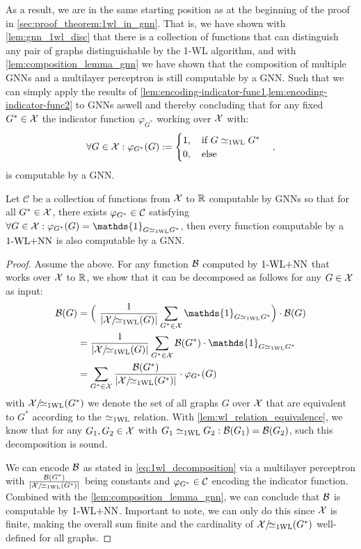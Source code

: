 As a result, we are in the same starting position as at the beginning of the proof in \autoref{sec:proof_theorem:1wl_in_gnn}. That is, we have shown with \cref{lem:gnn_1wl_disc} that there is a collection of functions that can distinguish any pair of graphs distinguishable by the 1-WL algorithm, and with \cref{lem:composition_lemma_gnn} we have shown that the composition of multiple GNNs and a multilayer perceptron is still computable by a GNN. Such that we can simply apply the results of \cref{lem:encoding-indicator-func1,lem:encoding-indicator-func2} to GNNs aswell and thereby concluding that for any fixed $G^* \in \mathcal{X}$ the indicator function $\varphi_{G^*}$ working over $\mathcal{X}$ with:
\begin{align*}
    \forall G \in \mathcal{X}: \varphi_{G^*}(G) := \begin{cases}
    1, \quad \text{if $G \simeq_{\text{1WL}} G^*$}\\
    0, \quad \text{else}
\end{cases},
\end{align*}
is computable by a GNN.

\begin{lemma}\label{lem:decompose_gnn_as_wl}
    Let $\mathcal{C}$ be a collection of functions from $\mathcal{X}$ to $\mathbb{R}$ computable by GNNs so that for all $G^* \in \mathcal{X}$, there exists 
    $\varphi_{G^*} \in \mathcal{C}$ satisfying $\forall G \in \cX: \varphi_{G^*}(G) = \mathds{1}_{G \wliso G^*}$, then every function computable by a $\text{1-WL+NN}$ is also computable by a GNN.
\end{lemma}

\begin{proof}
    Assume the above. For any function $\mathcal{B}$ computed by $\text{1-WL+NN}$ that works over $\mathcal{X}$ to $\mathbb{R}$, we show that it can be decomposed as follows for any $G \in \mathcal{X}$ as input:
    \begin{align}\label{eq:1wl_decomposition}
        \cB(G) &= \Bigl( \ \frac{1}{|\cX/\!{\wliso}(G)|}\sum_{G^* \in \cX} \mathds{1}_{G \wliso G^*} \Bigr) \cdot \cB(G) \nonumber \\
        &= \frac{1}{|\cX/\!{\wliso}(G)|}\sum_{G^* \in \cX} \cB(G^*) \cdot \mathds{1}_{G \wliso G^*} \nonumber \\
        &= \sum_{G^* \in \cX} \frac{\cB(G^*)}{|\cX/\!{\wliso}(G^*)|}  \cdot \varphi_{G^*}(G)
    \end{align}
    with $\mathcal{X}/\!{\simeq_{\text{1WL}}}(G^*)$ we denote the set of all graphs $G$ over $\mathcal{X}$ that are equivalent to $G^*$ according to the $\simeq_{\text{1WL}}$ relation. With \cref{lem:wl_relation_equivalence}, we know that for any $G_1, G_2 \in \mathcal{X}$ with $G_1 \simeq_{\text{1WL}} G_2: \mathcal{B}(G_1) = \mathcal{B}(G_2)$, such this decomposition is sound.
    
    
    We can encode $\mathcal{B}$ as stated in \autoref{eq:1wl_decomposition} via a multilayer perceptron with $\frac{\mathcal{B}(G^*)}{|\mathcal{X}/\!{\simeq_{\text{1WL}}}(G^*)|}$ being constants and $\varphi_{G^*} \in \mathcal{C}$ encoding the indicator function. Combined with the \autoref{lem:composition_lemma_gnn}, we can conclude that $\mathcal{B}$ is computable by $\text{1-WL+NN}$. Important to note, we can only do this since $\mathcal{X}$ is finite, making the overall sum finite and the cardinality of $\mathcal{X}/\!{\simeq_{\text{1WL}}}(G^*)$ well-defined for all graphs.
\end{proof}



\newpage